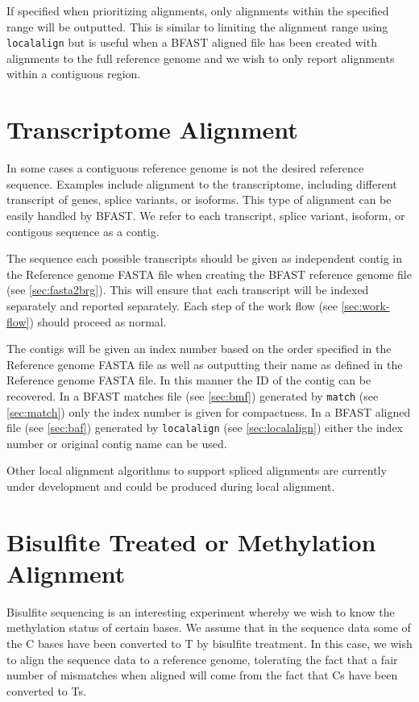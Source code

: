 \documentclass[a4paper,12pt]{book}
\newcommand{\TT}[1]{{\tt #1}} %
\newcommand{\RGFF}{Reference genome FASTA file}
\newcommand{\BRGF}{BFAST reference genome file} %
\newcommand{\BMF}{BFAST matches file} %
\newcommand{\BAF}{BFAST aligned file} %
\begin{document}
If specified when prioritizing alignments, only alignments within the specified range will be outputted.
This is similar to limiting the alignment range using \TT{localalign} but is useful when a \BAF{} has been created with alignments to the full reference genome and we wish to only report alignments within a contiguous region.

\section{Transcriptome Alignment}
\label{sec:transcriptome}
In some cases a contiguous reference genome is not the desired reference sequence.
Examples include alignment to the transcriptome, including different transcript of genes, splice variants, or isoforms.
This type of alignment can be easily handled by BFAST.
We refer to each transcript, splice variant, isoform, or contigous sequence as a contig.

The sequence each possible transcripts should be given as independent contig in the \RGFF{} when creating the \BRGF{} (see \autoref{sec:fasta2brg}).
This will ensure that each transcript will be indexed separately and reported separately.
Each step of the work flow (see \autoref{sec:work-flow}) should proceed as normal.

The contigs will be given an index number based on the order specified in the \RGFF{} as well as outputting their name as defined in the \RGFF{}.
In this manner the ID of the contig can be recovered.
In a \BMF{} (see \autoref{sec:bmf}) generated by \TT{match} (see \autoref{sec:match}) only the index number is given for compactness.
In a \BAF{} (see \autoref{sec:baf}) generated by \TT{localalign} (see \autoref{sec:localalign}) either the index number or original contig name can be used.

Other local alignment algorithms to support spliced alignments are currently under development and could be produced during local alignment.

\section{Bisulfite Treated or Methylation Alignment}
Bisulfite sequencing is an interesting experiment whereby we wish to know the methylation status of certain bases.
We assume that in the sequence data some of the C bases have been converted to T by bisulfite treatment.
In this case, we wish to align the sequence data to a reference genome, tolerating the fact that a fair number of mismatches when aligned will come from the fact that Cs have been converted to Ts.
\end{document}

